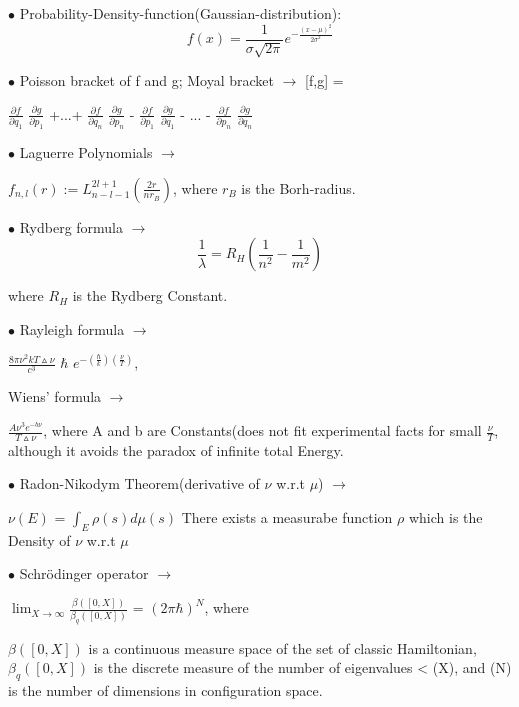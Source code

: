 \documentclass[a4paper, 10pt, onepage]{elegantbook}
\begin{document}
{$\bullet$ Probability-Density-function(Gaussian-distribution):  
\begin{equation}
f(x) = \frac{1}{\sigma \sqrt{2 \pi}} e^{- \frac{(x - \mu)^2}{2 \sigma^2}}
\end{equation}

$\bullet$ Poisson bracket of f and g;  Moyal bracket $\longrightarrow$ [f,g] = 

$\frac{\partial f}{\partial q_1}$ $\frac{\partial g}{\partial p_1}$ +...+ $\frac{\partial f}{\partial q_n}$ 
$\frac{\partial g}{\partial p_n}$ - $\frac{\partial f}{\partial p_1}$ $\frac{\partial g}{\partial q_1}$ - ... - 
$\frac{\partial f}{\partial p_n}$ $\frac{\partial g}{\partial q_n}$ 

$\bullet$ Laguerre Polynomials $\longrightarrow$  

$f_{n,l}(r) := L_{n - l - 1}^{2l +  1}$$ \left( \frac{2r}{nr_B} \right)$, where $r_B$ is the 
Borh-radius.  

$\bullet$ Rydberg formula $\longrightarrow$
\begin{equation}
\frac{1}{\lambda} = R_H \left({\frac{1}{n^2} - \frac{1}{m^2}} \right)
\end{equation}

where $R_H$ is the Rydberg Constant.  


$\bullet$ Rayleigh formula $\longrightarrow$  

 $\frac{8\pi\nu^2{kT}\vartriangle\nu}{c^3}$ $\hbar$ $e^{-\left(\frac{\hbar}{k}\right) \left(\frac{\nu}{T} \right)}$,  

Wiens' formula $\longrightarrow$ 

$\frac{A \nu^3 e^{-b \nu}}{T \vartriangle \nu}$, where A and b are Constants(does not fit experimental facts for small 
$\frac{ \nu}{T}$, although it avoids the paradox of infinite total Energy.  


$\bullet$ Radon-Nikodym Theorem(derivative of $\nu$ w.r.t $\mu$) $\longrightarrow$  

$\nu (E)$ = $\int_E \rho(s) d\mu(s)$ 
There exists a measurabe function $\rho$ which is the Density of $\nu$ w.r.t $\mu$ 

$\bullet$ Schr\"odinger operator $\longrightarrow$  

$\lim_{X \to \infty} \frac{\beta([0,X])}{\beta_q([0,X])}$ = $(2 \pi \hbar)^N$, where 

$\beta([0,X])$ is a continuous measure space of the set of classic Hamiltonian, $\beta_q([0,X])$ is the discrete
measure of the number of eigenvalues < (X), and (N) is the number of dimensions in configuration space.  

}
\end{document}

